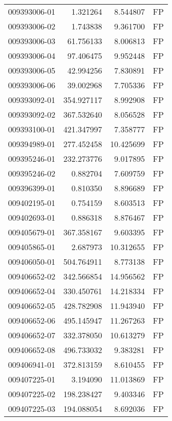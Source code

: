 \begin{tabular}{lrrl}
009393006-01 &    1.321264 &       8.544807 &   FP \\
009393006-02 &    1.743838 &       9.361700 &   FP \\
009393006-03 &   61.756133 &       8.006813 &   FP \\
009393006-04 &   97.406475 &       9.952448 &   FP \\
009393006-05 &   42.994256 &       7.830891 &   FP \\
009393006-06 &   39.002968 &       7.705336 &   FP \\
009393092-01 &  354.927117 &       8.992908 &   FP \\
009393092-02 &  367.532640 &       8.056528 &   FP \\
009393100-01 &  421.347997 &       7.358777 &   FP \\
009394989-01 &  277.452458 &      10.425699 &   FP \\
009395246-01 &  232.273776 &       9.017895 &   FP \\
009395246-02 &    0.882704 &       7.609759 &   FP \\
009396399-01 &    0.810350 &       8.896689 &   FP \\
009402195-01 &    0.754159 &       8.603513 &   FP \\
009402693-01 &    0.886318 &       8.876467 &   FP \\
009405679-01 &  367.358167 &       9.603395 &   FP \\
009405865-01 &    2.687973 &      10.312655 &   FP \\
009406050-01 &  504.764911 &       8.773138 &   FP \\
009406652-02 &  342.566854 &      14.956562 &   FP \\
009406652-04 &  330.450761 &      14.218334 &   FP \\
009406652-05 &  428.782908 &      11.943940 &   FP \\
009406652-06 &  495.145947 &      11.267263 &   FP \\
009406652-07 &  332.378050 &      10.613279 &   FP \\
009406652-08 &  496.733032 &       9.383281 &   FP \\
009406941-01 &  372.813159 &       8.610455 &   FP \\
009407225-01 &    3.194090 &      11.013869 &   FP \\
009407225-02 &  198.238427 &       9.403346 &   FP \\
009407225-03 &  194.088054 &       8.692036 &   FP \\

\end{tabular}
